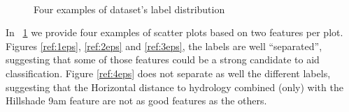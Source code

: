 \begin{figure}
	\centering
	\\
	\caption{\label{fig:plots}Four examples of dataset's label distribution}
\end{figure}
In \figurename~\ref{fig:plots} we provide four examples of scatter plots based on two features per plot. Figures \ref{ref:1eps}, \ref{ref:2eps} and \ref{ref:3eps}, the labels are well ``separated'', suggesting that some of those features could be a strong candidate to aid classification. Figure \ref{ref:4eps} does not separate as well the different labels, suggesting that the Horizontal distance to hydrology combined (only) with the Hillshade 9am feature are not as good features as the others.